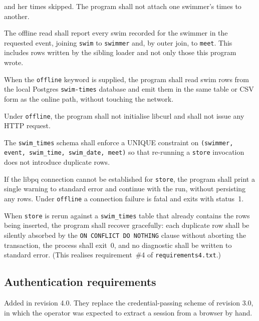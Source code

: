 \documentclass[12pt]{article}
\newcommand{\code}[1]{\texttt{#1}}
\newcommand{\req}[1]{\textbf{[#1]}}
\begin{document}
\begin{description}[style=nextline]
        and her times skipped.  The program shall not attach one
        swimmer's times to another.
  \item[\req{REQ-F-76}] The offline read shall report every swim
        recorded for the swimmer in the requested event, joining
        \texttt{swim} to \texttt{swimmer} and, by outer join,
        to \texttt{meet}.  This includes rows written by the sibling
        loader and not only those this program wrote.
  \item[\req{REQ-F-71}] When the \code{offline} keyword is
        supplied, the program shall read swim rows from the local
        Postgres \texttt{swim-times} database and emit them in the
        same table or CSV form as the online path, without
        touching the network.
  \item[\req{REQ-F-72}] Under \code{offline}, the program shall
        not initialise libcurl and shall not issue any HTTP
        request.
  \item[\req{REQ-F-73}] The \texttt{swim\_times} schema shall
        enforce a UNIQUE constraint on
        \code{(swimmer, event, swim\_time, swim\_date, meet)} so
        that re-running a \code{store} invocation does not
        introduce duplicate rows.
  \item[\req{REQ-F-74}] If the libpq connection cannot be
        established for \code{store}, the program shall print a
        single warning to standard error and continue with the
        run, without persisting any rows.  Under \code{offline} a
        connection failure is fatal and exits with status~1.
  \item[\req{REQ-F-75}] When \code{store} is rerun against a
        \texttt{swim\_times} table that already contains the rows
        being inserted, the program shall recover gracefully: each
        duplicate row shall be silently absorbed by the
        \texttt{ON~CONFLICT~DO~NOTHING} clause without aborting
        the transaction, the process shall exit~0, and no
        diagnostic shall be written to standard error.
        (This realises requirement~\#4 of \texttt{requirements4.txt}.)
\end{description}

\subsection{Authentication requirements}

Added in revision 4.0.  They replace the credential-passing scheme of
revision 3.0, in which the operator was expected to extract a session
from a browser by hand.
\end{document}
